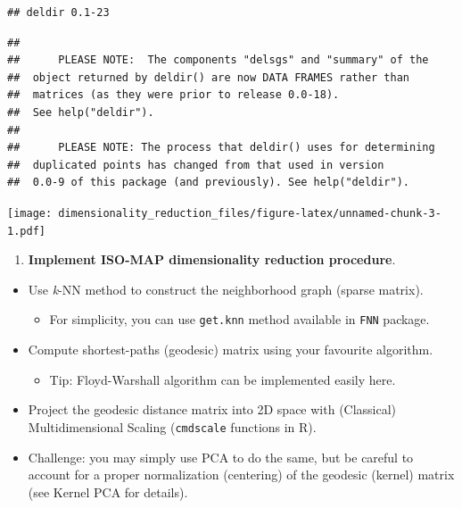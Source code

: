 \documentclass[]{article}
\providecommand{\tightlist}{%
  \setlength{\itemsep}{0pt}\setlength{\parskip}{0pt}}
\begin{document}
\begin{verbatim}
## deldir 0.1-23
\end{verbatim}

\begin{verbatim}
## 
##      PLEASE NOTE:  The components "delsgs" and "summary" of the
##  object returned by deldir() are now DATA FRAMES rather than
##  matrices (as they were prior to release 0.0-18).
##  See help("deldir").
##  
##      PLEASE NOTE: The process that deldir() uses for determining
##  duplicated points has changed from that used in version
##  0.0-9 of this package (and previously). See help("deldir").
\end{verbatim}

\texttt{[image: dimensionality\_reduction\_files/figure-latex/unnamed-chunk-3-1.pdf]}

\begin{enumerate}
\def\labelenumi{\arabic{enumi}.}
\setcounter{enumi}{1}
\tightlist
\item
  \textbf{Implement ISO-MAP dimensionality reduction procedure}.
\end{enumerate}

\begin{itemize}
\tightlist
\item
  Use \emph{k}-NN method to construct the neighborhood graph (sparse
  matrix).

  \begin{itemize}
  \tightlist
  \item
    For simplicity, you can use \texttt{get.knn} method available in
    \texttt{FNN} package.
  \end{itemize}
\item
  Compute shortest-paths (geodesic) matrix using your favourite
  algorithm.

  \begin{itemize}
  \tightlist
  \item
    Tip: Floyd-Warshall algorithm can be implemented easily here.
  \end{itemize}
\item
  Project the geodesic distance matrix into 2D space with (Classical)
  Multidimensional Scaling (\texttt{cmdscale} functions in R).
\item
  Challenge: you may simply use PCA to do the same, but be careful to
  account for a proper normalization (centering) of the geodesic
  (kernel) matrix (see Kernel PCA for details).
\end{itemize}
\end{document}

